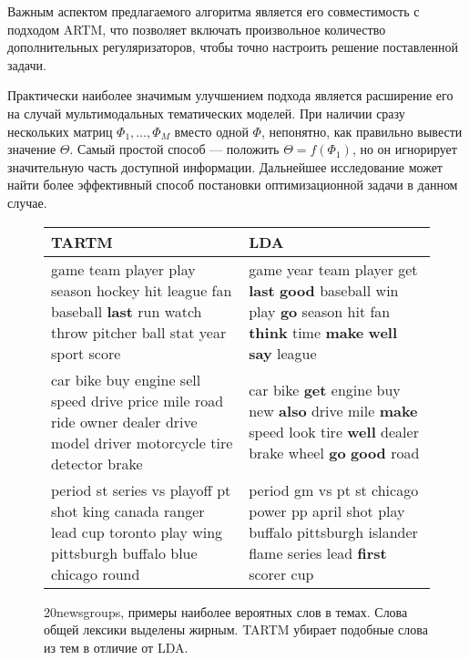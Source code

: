 Важным аспектом предлагаемого алгоритма является его совместимость с подходом ARTM, что позволяет включать произвольное количество дополнительных регуляризаторов, чтобы точно настроить решение поставленной задачи.

Практически наиболее значимым улучшением подхода является расширение его на случай мультимодальных тематических моделей. При наличии сразу нескольких матриц $\Phi_1, \dots, \Phi_M$ вместо одной $\Phi $, непонятно, как правильно вывести значение $\Theta $. Самый простой способ --- положить $\Theta = f(\Phi_1) $, но он игнорирует значительную часть доступной информации. Дальнейшее исследование может найти более эффективный способ постановки оптимизационной задачи в данном случае.


\clearpage
\begin{figure*}[!h]
\begin{center}
    \begin{small}
    \begin{tabular}{ | p{8.4cm}| p{8cm} |}
    \hline
    TARTM &  LDA \\ \hline
    game team player play season hockey hit league fan baseball \textbf{last} run watch throw pitcher ball stat year sport score & game year team player get \textbf{last} \textbf{good} baseball win play \textbf{go} season hit fan \textbf{think} time \textbf{make} \textbf{well} \textbf{say} league \\ \hline
    car bike buy engine sell speed drive price mile road ride owner dealer drive model driver motorcycle tire detector brake & car bike \textbf{get} engine buy new \textbf{also} drive mile \textbf{make} speed look tire \textbf{well} dealer brake wheel \textbf{go} \textbf{good} road \\ \hline
    period st series vs playoff pt shot king canada ranger lead cup toronto play wing pittsburgh buffalo blue chicago round & period gm vs pt st chicago power pp april shot play buffalo pittsburgh islander flame series lead \textbf{first} scorer cup \\ \hline
    \end{tabular}
    \end{small}
\caption{20newsgroups, примеры наиболее вероятных слов в темах. Слова общей лексики выделены жирным. TARTM убирает подобные слова из тем в отличие от LDA.}\end{center}
\end{figure*}

